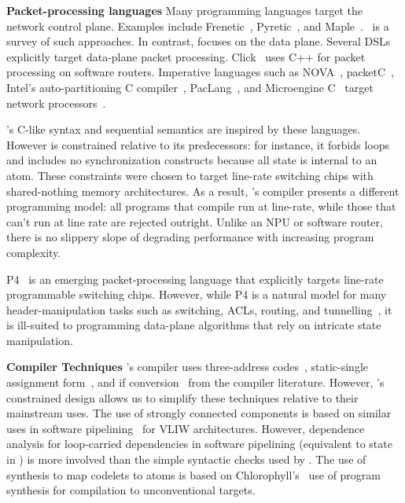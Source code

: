 \textbf{Packet-processing languages}
Many programming languages target the network control plane. Examples include
Frenetic~\cite{frenetic}, Pyretic~\cite{pyretic}, and
Maple~\cite{maple}.~\cite{language_survey} is a survey of such approaches.  In
contrast, \pktlanguage focuses on the data plane. Several DSLs explicitly
target data-plane packet processing. Click~\cite{click} uses C++ for packet
processing on software routers. Imperative languages such as NOVA~\cite{nova},
packetC~\cite{packetc}, Intel's auto-partitioning C
compiler~\cite{intel_uiuc_pldi}, PacLang~\cite{paclang_lang,
paclang_partitioner}, and Microengine C~\cite{microenginec, intel_ixa} target
network processors~\cite{ixp2800, ixp4xx}.

\pktlanguage's C-like syntax and sequential semantics are inspired by these
languages. However \pktlanguage is constrained relative to its predecessors:
for instance, it forbids loops and includes no synchronization constructs
because all state is internal to an atom. These constraints were chosen to
target line-rate switching chips with shared-nothing memory architectures. As a
result, \pktlanguage's compiler presents a different programming model: all
\pktlanguage programs that compile run at line-rate, while those that can't run
at line rate are rejected outright. Unlike an NPU or software router, there is
no slippery slope of degrading performance with increasing program complexity.

P4~\cite{p4} is an emerging packet-processing language that explicitly targets
line-rate programmable switching chips. However, while P4 is a natural model
for many header-manipulation tasks such as switching, ACLs, routing, and
tunnelling~\cite{dc_p4}, it is ill-suited to programming data-plane algorithms that
rely on intricate state manipulation.

\textbf{Compiler Techniques}
\pktlanguage's compiler uses three-address codes~\cite{tac}, static-single
assignment form~\cite{ssa}, and if conversion~\cite{if_conversion} from the
compiler literature. However, \pktlanguage's constrained design allows us to
simplify these techniques relative to their mainstream uses.  The use of
strongly connected components is based on similar uses in software
pipelining~\cite{software_pipelining} for VLIW architectures. However,
dependence analysis for loop-carried dependencies in software pipelining
(equivalent to state in \pktlanguage) is more involved than the simple
syntactic checks used by \pktlanguage. The use of synthesis to map codelets to
atoms is based on Chlorophyll's~\cite{chlorophyll} use of program synthesis for
compilation to unconventional targets.

